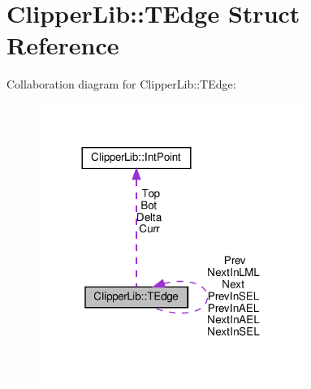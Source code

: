 \hypertarget{structClipperLib_1_1TEdge}{}\section{Clipper\+Lib\+:\+:T\+Edge Struct Reference}
\label{structClipperLib_1_1TEdge}


Collaboration diagram for Clipper\+Lib\+:\+:T\+Edge\+:
\nopagebreak
\begin{figure}[H]
\begin{center}
\leavevmode
\includegraphics[width=245pt]{structClipperLib_1_1TEdge__coll__graph}
\end{center}
\end{figure}
